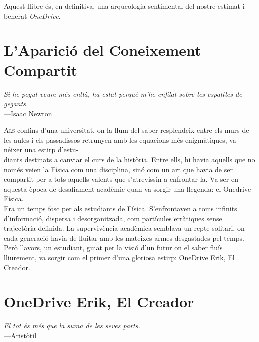 \documentclass[12pt, a5paper, twoside]{book}
\let\cleardoublepage\clearpage %
\newcommand{\epigraf}[2]{%
    \begin{flushright}
        \textit{#1}\\
        {\small ---#2}
    \end{flushright}
    \vspace{2em}
}
\begin{document}
\medskip

\noindent
Aquest llibre és, en definitiva, una arqueologia sentimental del nostre estimat i benerat \textit{OneDrive}.

\cleardoublepage

\tableofcontents
\cleardoublepage

\chapter{L'Aparició del Coneixement Compartit}

\epigraf{Si he pogut veure més enllà, ha estat perquè m’he enfilat sobre les espatlles de gegants.}{Isaac Newton}

\lettrine[loversize=0.2, lines=2]{A}{ls} confins d'una universitat, on la llum del saber resplendeix entre els murs de les aules i els passadissos retrunyen amb les equacions més enigmàtiques, va néixer una estirp d'estu-\\
diants destinats a canviar el curs de la història. Entre ells, hi havia aquells que no només veien la Física com una disciplina, sinó com un art que havia de ser compartit per a tots aquells valents que s'atrevissin a enfrontar-la. Va ser en aquesta època de desafiament acadèmic quan va sorgir una llegenda: el Onedrive Física.\\

Era un temps fosc per als estudiants de Física. S'enfrontaven a toms infinits d'informació, dispersa i desorganitzada, com partícules erràtiques sense trajectòria definida. La supervivència acadèmica semblava un repte solitari, on cada generació havia de lluitar amb les mateixes armes desgastades pel temps. Però llavors, un estudiant, guiat per la visió d'un futur on el saber fluís lliurement, va sorgir com el primer d'una gloriosa estirp: OneDrive Erik, El Creador.

\chapter{OneDrive Erik, El Creador}

\epigraf{El tot és més que la suma de les seves parts.}{Aristòtil}
\end{document}
